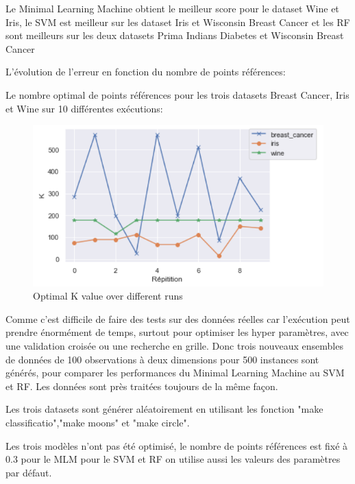 \documentclass[12pt,a4paper]{report}
\begin{document}
\par Le Minimal Learning Machine obtient le meilleur score pour le dataset Wine et Iris, le SVM est meilleur sur les dataset Iris et Wisconsin Breast Cancer et les RF sont meilleurs sur les deux datasets Prima Indians Diabetes et Wisconsin Breast Cancer\\
\par L'évolution de l'erreur en fonction du nombre de points références:\
\par Le nombre optimal de points références pour les trois datasets Breast Cancer, Iris et Wine sur 10 différentes exécutions: \\

\begin{figure}[!h]
\vspace{-0.5cm}
    \centering
\includegraphics[height=0.4\textwidth]{classif2.png}
\caption{Optimal K value over different runs}
\end{figure}
\par Comme c'est difficile de faire des tests sur des données réelles car l'exécution peut prendre énormément de temps, surtout pour optimiser les hyper paramètres, avec une validation croisée ou une recherche en grille. Donc trois nouveaux ensembles de données de 100 observations à deux dimensions pour 500 instances sont générés, pour comparer les performances du Minimal Learning Machine au SVM et RF. Les données sont près traitées toujours de la même façon.
\par Les trois datasets sont générer aléatoirement en utilisant les fonction "make classificatio","make moons" et "make circle".\\

\par Les trois modèles n'ont pas été optimisé, le nombre de points références est fixé à 0.3 pour le MLM pour le SVM et RF on utilise aussi les valeurs des paramètres par défaut.
\end{document}
